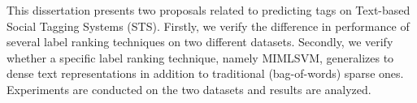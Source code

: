 \begin{foreignabstract}

This dissertation presents two proposals related to predicting tags on Text-based Social Tagging Systems (STS). Firstly, we verify the difference in performance of several label ranking techniques on two different datasets. Secondly, we verify whether a specific label ranking technique, namely MIMLSVM, generalizes to dense text representations in addition to traditional (bag-of-words) sparse ones. Experiments are conducted on the two datasets and results are analyzed.

\end{foreignabstract}